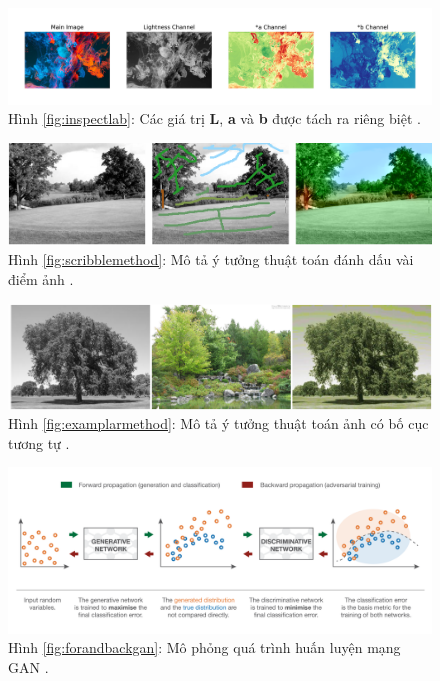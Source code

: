 \documentclass[a4paper, 12pt]{article}
\begin{document}
\begin{figure}[!h]
\captionsetup{width=0.8\textwidth}
\centering
\includegraphics[width=16cm]{images/2_3.jpeg}
\caption*{Hình \ref{fig:inspectlab}: Các giá trị \textbf{L}, \textbf{a} và \textbf{b} được tách ra riêng biệt \cite{moeincolorization2020}.}
\end{figure}

\begin{figure}[!h]
\captionsetup{width=0.8\textwidth}
\centering
\includegraphics[width=15cm]{images/2_4.png}
\caption*{Hình \ref{fig:scribblemethod}: Mô tả ý tưởng thuật toán đánh dấu vài điểm ảnh \cite{trungcolorization2018}.}
\end{figure}

\begin{figure}[!h]
\captionsetup{width=0.8\textwidth}
\centering
\includegraphics[width=15cm]{images/2_5.png}
\caption*{Hình \ref{fig:examplarmethod}: Mô tả ý tưởng thuật toán ảnh có bố cục tương tự \cite{trungcolorization2018}.}
\end{figure}

\begin{figure}[!h]
\captionsetup{width=0.8\textwidth}
\centering
\includegraphics[width=16.5cm]{images/2_72.png}
\caption*{Hình \ref{fig:forandbackgan}: Mô phỏng quá trình huấn luyện mạng GAN \cite{josephgan2019}.}
\end{figure}
\end{document}
